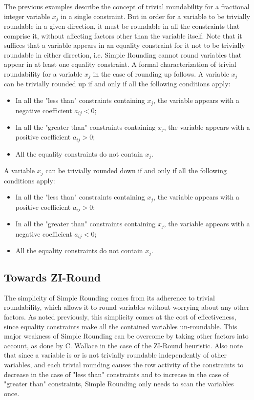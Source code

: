 \documentclass[a4paper,12pt,twoside]{scrbook}
\begin{document}
The previous examples describe the concept of trivial roundability for a fractional integer variable $x_j$ in a single constraint. But in order for a variable to be trivially roundable in a given direction, it must be roundable in all the constraints that comprise it, without affecting factors other than the variable itself. 
Note that it suffices that a variable appears in an equality constraint for it not to be trivially roundable in either direction, i.e. Simple Rounding cannot round variables that appear in at least one equality constraint.
A formal characterization of trivial roundability for a variable $x_j$ in the case of rounding up follows.
A variable $x_j$ can be trivially rounded up if and only if all the following conditions apply:
\begin{itemize}
	\item In all the "less than" constraints containing $x_j$, the variable appears with a negative coefficient $a_{ij} < 0$;
	\item In all the "greater than" constraints containing $x_j$, the variable appears with a positive coefficient $a_{ij} > 0$;
	\item All the equality constraints do not contain $x_j$.
\end{itemize}
A variable $x_j$ can be trivially rounded down if and only if all the following conditions apply:
\begin{itemize}
	\item In all the "less than" constraints containing $x_j$, the variable appears with a positive coefficient $a_{ij} > 0$;
	\item In all the "greater than" constraints containing $x_j$, the variable appears with a negative coefficient $a_{ij} < 0$;
	\item All the equality constraints do not contain $x_j$.
\end{itemize}
\par

\subsection{Towards ZI-Round}
The simplicity of Simple Rounding comes from its adherence to trivial roundability, which allows it to round variables without worrying about any other factors. As noted previously, this simplicity comes at the cost of effectiveness, since equality constraints make all the contained variables un-roundable. This major weakness of Simple Rounding can be overcome by taking other factors into account, as done by C. Wallace \cite{wallace2010} in the case of the ZI-Round heuristic. Also note that since a variable is or is not trivially roundable independently of other variables, and each trivial rounding causes the row activity of the constraints to decrease in the case of "less than" constraints and to increase in the case of "greater than" constraints, Simple Rounding only needs to scan the variables once.
\end{document}
